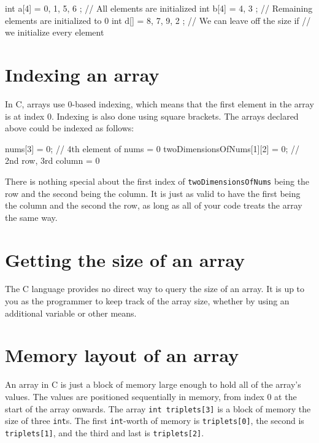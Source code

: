 \begin{codeblock}
int a[4] = { 0, 1, 5, 6 }; // All elements are initialized
int b[4] = { 4, 3 }; // Remaining elements are initialized to 0
int d[] = { 8, 7, 9, 2 }; // We can leave off the size if
                             // we initialize every element
\end{codeblock}

\section{Indexing an array}

In C, arrays use 0-based indexing, which means that the first element in the array is at index 0.
Indexing is also done using square brackets.
The arrays declared above could be indexed as follows:

\begin{codeblock}
nums[3] = 0; // 4th element of nums = 0
twoDimensionsOfNums[1][2] = 0; // 2nd row, 3rd column = 0
\end{codeblock}

There is nothing special about the first index of \lstinline!twoDimensionsOfNums! being the row and the second being the column.
It is just as valid to have the first being the column and the second the row, as long as all of your code treats the array the same way.

\section{Getting the size of an array}

The C language provides no direct way to query the size of an array.
It is up to you as the programmer to keep track of the array size, whether by using an additional variable or other means.

\section{Memory layout of an array}

An array in C is just a block of memory large enough to hold all of the array's values.
The values are positioned sequentially in memory, from index 0 at the start of the array onwards.
The array \lstinline!int triplets[3]! is a block of memory the size of three \lstinline!int!s.
The first \lstinline!int!-worth of memory is \lstinline!triplets[0]!, the second is \lstinline!triplets[1]!, and the third and last is \lstinline!triplets[2]!.


